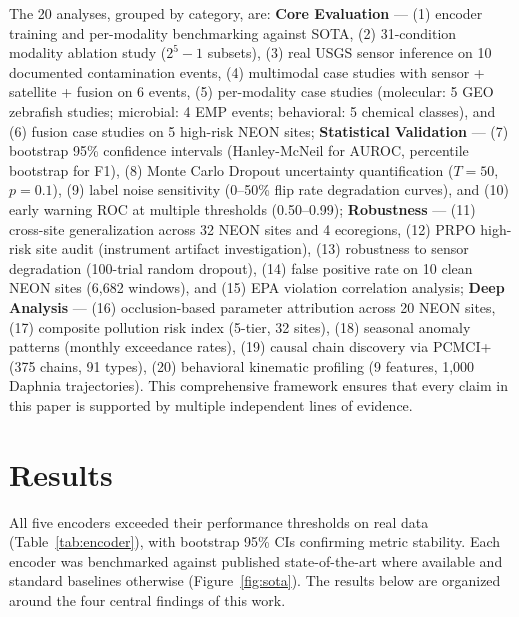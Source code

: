 \documentclass[12pt]{article}
\begin{document}
The 20 analyses, grouped by category, are: \textbf{Core Evaluation} --- (1) encoder training and per-modality benchmarking against SOTA, (2) 31-condition modality ablation study ($2^5 - 1$ subsets), (3) real USGS sensor inference on 10 documented contamination events, (4) multimodal case studies with sensor + satellite + fusion on 6 events, (5) per-modality case studies (molecular: 5 GEO zebrafish studies; microbial: 4 EMP events; behavioral: 5 chemical classes), and (6) fusion case studies on 5 high-risk NEON sites; \textbf{Statistical Validation} --- (7) bootstrap 95\% confidence intervals (Hanley-McNeil for AUROC, percentile bootstrap for F1), (8) Monte Carlo Dropout uncertainty quantification ($T = 50$, $p = 0.1$), (9) label noise sensitivity (0--50\% flip rate degradation curves), and (10) early warning ROC at multiple thresholds (0.50--0.99); \textbf{Robustness} --- (11) cross-site generalization across 32 NEON sites and 4 ecoregions, (12) PRPO high-risk site audit (instrument artifact investigation), (13) robustness to sensor degradation (100-trial random dropout), (14) false positive rate on 10 clean NEON sites (6,682 windows), and (15) EPA violation correlation analysis; \textbf{Deep Analysis} --- (16) occlusion-based parameter attribution across 20 NEON sites, (17) composite pollution risk index (5-tier, 32 sites), (18) seasonal anomaly patterns (monthly exceedance rates), (19) causal chain discovery via PCMCI+ (375 chains, 91 types), (20) behavioral kinematic profiling (9 features, 1,000 Daphnia trajectories). This comprehensive framework ensures that every claim in this paper is supported by multiple independent lines of evidence.

\section{Results}

All five encoders exceeded their performance thresholds on real data (Table~\ref{tab:encoder}), with bootstrap 95\% CIs confirming metric stability. Each encoder was benchmarked against published state-of-the-art where available and standard baselines otherwise (Figure~\ref{fig:sota}). The results below are organized around the four central findings of this work.
\end{document}
